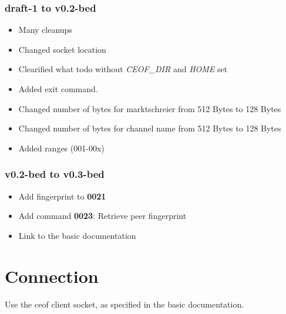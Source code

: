 \documentclass[12pt,a4paper]{book}
\begin{document}
\subsubsection{draft-1 to v0.2-bed}
\begin{itemize}
\item Many cleanups
\item Changed socket location
\item Clearified what todo without \textit{CEOF\_DIR} and \textit{HOME} set
\item Added exit command.
\item Changed number of bytes for marktschreier from 512 Bytes to 128 Bytes
\item Changed number of bytes for channel name  from 512 Bytes to 128 Bytes
\item Added ranges (001-00x)
\end{itemize}
\subsubsection{v0.2-bed to v0.3-bed}
\begin{itemize}
\item Add fingerprint to \textbf{0021}
\item Add command \textbf{0023}: Retrieve peer fingerprint
\item Link to the basic documentation
\end{itemize}
\section{Connection}
Use the ceof client socket, as specified in the basic documentation.
\end{document}
